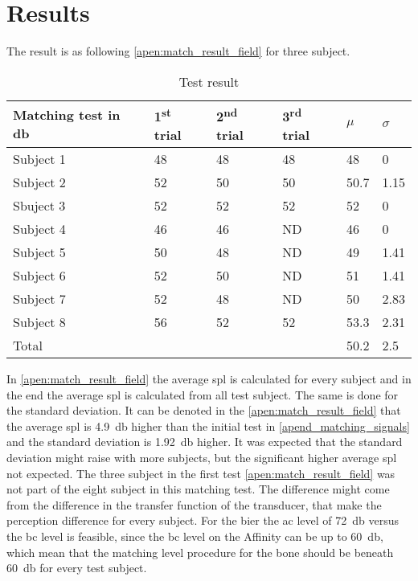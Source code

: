 \section*{Results}

The result is as following \autoref{apen:match_result_field} for three subject. 

\begin{table}[H]
\centering
\caption{Test result}
\begin{tabular}{l|lll|ll}
Matching test in \si{\decibel}   & 1\textsuperscript{st} trial & 2\textsuperscript{nd} trial & 3\textsuperscript{rd} trial & $\mu$ & $\sigma$ \\ \hline
Subject 1  & 48          & 48           & 48          & 48          & 0                  \\
Subject 2  & 52          & 50           & 50          & 50.7        & 1.15               \\
Sbuject 3  & 52          & 52           & 52          & 52          & 0                  \\
Subject 4  & 46          & 46           & ND          & 46          & 0                  \\
Subject 5  & 50          & 48           & ND          & 49          & 1.41               \\
Subject 6  & 52          & 50           & ND          & 51          & 1.41               \\
Subject 7  & 52          & 48           & ND          & 50          & 2.83               \\
Subject 8  & 56          & 52           & 52          & 53.3        & 2.31               \\ \hline
Total      &             &              &             & 50.2        & 2.5               
\end{tabular}
\label{apen:match_result_field}
\end{table}

In \autoref{apen:match_result_field} the average \gls{spl} is calculated for every subject and in the end the average \gls{spl} is calculated from all test subject. The same is done for the standard deviation. It can be denoted in the  \autoref{apen:match_result_field} that the average \gls{spl} is \SI{4.9}{\decibel} higher than the initial test in \autoref{apend_matching_signals} and the standard deviation is \SI{1.92}{\decibel} higher. It was expected that the standard deviation might raise with more subjects, but the significant higher average \gls{spl} not expected. The three subject in the first test     \autoref{apen:match_result_field} was not part of the eight subject in this matching test. The difference might come from the difference in the transfer function of the transducer, that make the perception difference for every subject. For the \gls{bier} the \gls{ac} level of \SI{72}{\decibel} versus the  \gls{bc} level is feasible, since the \gls{bc} level on the Affinity can be up to \SI{60}{\decibel}, which mean that the matching level procedure for the bone should be beneath \SI{60}{\decibel} for every test subject.


